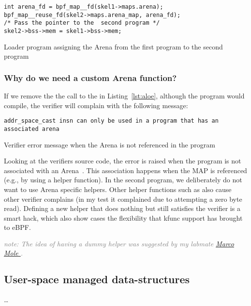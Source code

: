 \documentclass{article}
\begin{document}
\begin{listing}
\begin{verbatim}
int arena_fd = bpf_map__fd(skel1->maps.arena);
bpf_map__reuse_fd(skel2->maps.arena_map, arena_fd);
/* Pass the pointer to the  second program */
skel2->bss->mem = skel1->bss->mem;
\end{verbatim}
\caption{Loader program assigning the Arena from the first program to the second program}
\label{lst:share-map-ref}
\end{listing}

\subsubsection{Why do we need a custom Arena function?}
\label{sec:need_custom}
If we remove the the call to the  in
Listing~\ref{lst:aloe}, although the program would compile, the verifier will
complain with the following message:

\begin{listing}
\begin{verbatim}
addr_space_cast insn can only be used in a program that has an associated arena
\end{verbatim}
\caption{Verifier error message when the Arena is not referenced in the program}
\label{lst:verifier_err_msg}
\end{listing}

Looking at the verifiers source code, the error is raised when the program
is not associated with an Arena~\cite{verifier_arena_not_set}. This association
happens when the MAP is referenced (e.g., by using a helper function).
In the second program, we deliberately do not want to use Arena specific
helpers. Other helper functions such as  also cause
other verifier complains (in my test it complained due to attempting a zero
byte read). Defining a new helper that does nothing but still satisfies the
verifier is a smart hack, which also show cases the flexibility that kfunc
support has brought to eBPF.

\textcolor{gray}{\textit{note: The idea of having a dummy helper was suggested
by my labmate \href{https://github.com/marcomole00/}{Marco Mole }.}}


\subsection{User-space managed data-structures}

\dots{}




\end{document}
